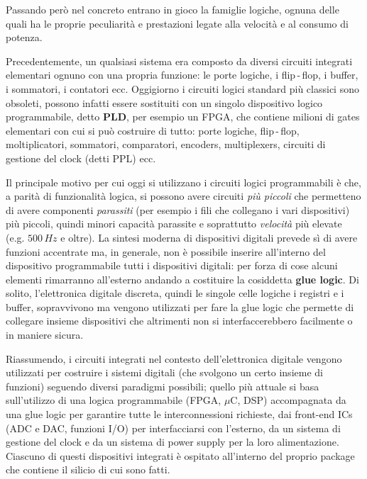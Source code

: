 \documentclass[12pt, a4paper]{report}
\begin{document}
Passando però nel concreto entrano in gioco la famiglie logiche, ognuna delle quali ha le proprie peculiarità e prestazioni legate alla velocità e al consumo di potenza.

Precedentemente, un qualsiasi sistema era composto da diversi circuiti integrati elementari ognuno con una propria funzione: le porte logiche, i flip\,-\,flop, i buffer, i sommatori, i contatori ecc. Oggigiorno i circuiti logici standard più classici sono obsoleti, possono infatti essere sostituiti con un singolo dispositivo logico programmabile, detto \textbf{PLD}, per esempio un FPGA, che contiene milioni di gates elementari con cui si può costruire di tutto: porte logiche, flip\,-\,flop, moltiplicatori, sommatori, comparatori, encoders, multiplexers, circuiti di gestione del clock (detti PPL) ecc.

Il principale motivo per cui oggi si utilizzano i circuiti logici programmabili è che, a parità di funzionalità logica, si possono avere circuiti \textit{più piccoli} che permetteno di avere componenti \textit{parassiti} (per esempio i fili che collegano i vari dispositivi) più piccoli, quindi minori capacità parassite e soprattutto \textit{velocità} più elevate (e.g. $500\,\textit{Hz}$ e oltre). La sintesi moderna di dispositivi digitali prevede sì di avere funzioni accentrate ma, in generale, non è possibile inserire all'interno del dispositivo programmabile tutti i dispositivi digitali: per forza di cose alcuni elementi rimarranno all'esterno andando a costituire la cosiddetta \textbf{glue logic}. Di solito, l'elettronica digitale discreta, quindi le singole celle logiche i registri e i buffer, sopravvivono ma vengono utilizzati per fare la glue logic che permette di collegare insieme dispositivi che altrimenti non si interfaccerebbero facilmente o in maniere sicura.

Riassumendo, i circuiti integrati nel contesto dell'elettronica digitale vengono utilizzati per costruire i sistemi digitali (che svolgono un certo insieme di funzioni) seguendo diversi paradigmi possibili; quello più attuale si basa sull'utilizzo di una logica programmabile (FPGA, $\mu$C, DSP) accompagnata da una glue logic per garantire tutte le interconnessioni richieste, dai front-end ICs (ADC e DAC, funzioni I/O) per interfacciarsi con l'esterno, da un sistema di gestione del clock e da un sistema di power supply per la loro alimentazione. Ciascuno di questi dispositivi integrati è ospitato all'interno del proprio package che contiene il silicio di cui sono fatti.
\end{document}
